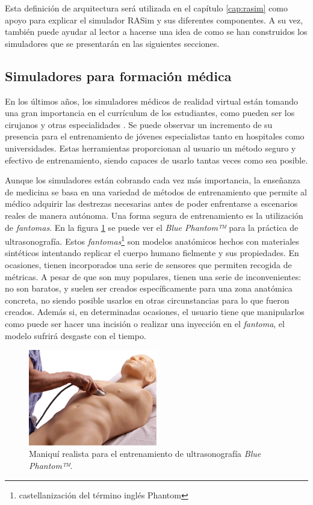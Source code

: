 Esta definición de arquitectura será utilizada en el capítulo \ref{cap:rasim} como apoyo para explicar el simulador \ac{RASim} y sus diferentes componentes. A su vez, también puede ayudar al lector a hacerse una idea de como se han construidos los simuladores que se presentarán en las siguientes secciones.

\subsection{Simuladores para formación médica}
\label{art:medicalsim}

En los últimos años, los simuladores médicos de realidad virtual están tomando una gran importancia en el currículum de los estudiantes, como pueden ser los cirujanos y otras especialidades \cite{PATEL2017266.e7}. Se puede observar un incremento de su presencia para el entrenamiento de jóvenes especialistas tanto en hospitales como universidades. Estas herramientas proporcionan al usuario un método seguro y efectivo de entrenamiento, siendo capaces de usarlo tantas veces como sea posible. 

Aunque los simuladores están cobrando cada vez más importancia, la enseñanza de medicina se basa en una variedad de métodos de entrenamiento que permite al médico adquirir las destrezas necesarias antes de poder enfrentarse a escenarios reales de manera autónoma. Una forma segura de entrenamiento es la utilización de \emph{fantomas}\cite{phantomra}. En la figura \ref{fig:phantom} se puede ver el \emph{Blue Phantom™}\cite{BluePH} para la práctica de ultrasonografía. Estos \emph{fantomas}\footnote{castellanización del término inglés Phantom} son modelos anatómicos hechos con materiales sintéticos intentando replicar el cuerpo humano fielmente y sus propiedades. En ocasiones, tienen incorporados una serie de sensores que permiten recogida de métricas. A pesar de que son muy populares, tienen una serie de inconvenientes: no son baratos, y suelen ser creados específicamente para una zona anatómica concreta, no siendo posible usarlos en otras circunstancias para lo que fueron creados. Además si, en determinadas ocasiones, el usuario tiene que manipularlos como puede ser hacer una incisión o realizar una inyección en el \emph{fantoma}, el modelo sufrirá desgaste con el tiempo.
\begin{figure}[h]
   \centering
    \includegraphics[width=0.5\textwidth]{IMG/fast_trauma.jpg}
    \caption{Maniquí realista para el entrenamiento de ultrasonografía  \emph{Blue Phantom™}\cite{BluePH}. }
   \label{fig:phantom}
\end{figure}

